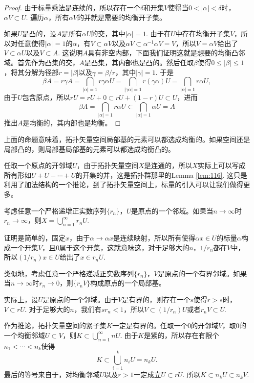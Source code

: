\begin{proof}
	由于标量乘法是连续的，所以存在一个$\delta$和开集$V$使得当$0<|\alpha|<\delta$时，$\alpha V\subset U$. 遍历$\alpha$，所有$\alpha V$的并就是需要的均衡开子集。

	如果$U$是凸的，设$A$是所有$\alpha U$的交，其中$|\alpha|=1$. 由于在$U$中存在均衡开子集$V$，所以对任意使得$|\alpha|=1$的$\alpha$，有$V\subset \alpha V$以及$\alpha V\subset \alpha^{-1}\alpha V=V$，所以$V=\alpha V$给出了$V\subset \alpha U$以及$V\subset A$. 这说明$A$具有非空内部，下面我们证明这就是想要的均衡凸邻域。首先作为凸集的交，$A$是凸集，其内部也是凸的。然后任取$\beta$使得$0\leq |\beta|\leq 1$，将其分解为径部$r=|\beta|$以及$\gamma=\beta/r$，其中$|\gamma|=1$. 于是
	\[
	\beta A=r\gamma A=\bigcap_{|\alpha|=1}r\gamma\alpha U=\bigcap_{|\gamma\alpha|=1}r(\gamma\alpha) U=\bigcap_{|\alpha|=1}r\alpha U,
	\]
	由于$U$包含原点，所以$rU=rU+0\subset rU+(1-r)U\subset U$，进而
	\[
	\beta A=\bigcap_{|\alpha|=1}r\alpha U\subset \bigcap_{|\alpha|=1}\alpha U=A
	\]
	推出$A$是均衡的，其内部也是均衡。
\end{proof}

上面的命题意味着，拓扑矢量空间局部基的元素可以都选成均衡的。如果空间还是局部凸的，则局部基局部基的元素可以都选成均衡凸的。

\begin{para}
任取一个原点的开邻域$U$，由于拓扑矢量空间$X$是连通的，所以$X$实际上可以写成所有形如$U+U+\cdots+U$的开集的并，这是拓扑群那里的Lemma \ref{lem:116}. 这只是利用了加法结构的一个推论，到了拓扑矢量空间上，标量的引入可以让我们做得更多。

考虑任意一个严格递增正实数序列$\{r_n\}$，$U$是原点的一个邻域。如果当$n\to \infty$时$r_n\to \infty$，则$X=\bigcup_{n=1}^\infty r_n U$.

证明是简单的，固定$x$，由于$\alpha\to \alpha x$是连续映射，所以所有使得$\alpha x\in U$的标量$\alpha$构成一个开集$V$，且$0$属于这个开集，这就意味这，对于足够大的$n$，$1/r_n$都在$V$中，所以$(1/r_n) x\in U$给出了$x\in r_n U$.

类似地，考虑任意一个严格递减正实数序列$\{r_n\}$，$V$是原点的一个有界邻域。如果当$n\to \infty$时$r_n\to 0$，则$\{r_n V\}$构成原点的一个局部基。

实际上，设$U$是原点的一个邻域。由于$V$是有界的，则存在一个$s$使得$r>s$时，$V\subset rU$. 对于足够大的$n$，我们有$sr_n<1$，所以$V\subset (1/r_n)U$或者$r_n V\subset U$.
\end{para}

作为推论，拓扑矢量空间的紧子集$K$一定是有界的。任取一个$0$的开邻域$V$，取$0$的一个均衡邻域$U\subset V$，则$K\subset \bigcup_{n=1}^\infty nU$. 由于$K$是紧的，所以存在有限个$n_1< \cdots <n_k$使得
\[
	K\subset \bigcup_{i=1}^k n_iU=n_k U.
\]
最后的等号来自于，对均衡邻域$U$以及$r>1$一定成立$U\subset rU$. 所以$K\subset n_k U\subset n_k V$.

